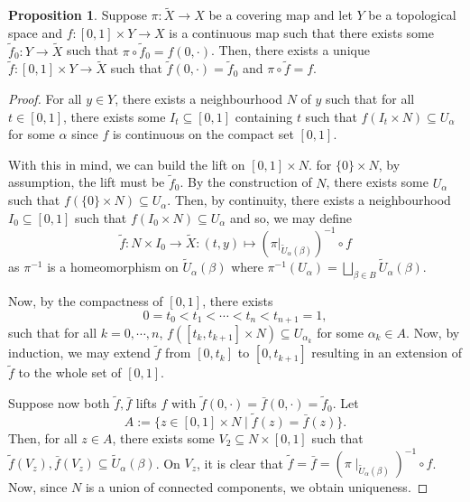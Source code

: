\documentclass[]{article}
\theoremstyle{definition}
\theoremstyle{definition}
\newtheorem{proposition}{Proposition}[section]
\begin{document}
\begin{proposition}
  Suppose \(\pi : \tilde X \to X\) be a covering map and let \(Y\) be a topological space and 
  \(f : [0, 1] \times Y \to X\) is a continuous map such that there exists some 
  \(\tilde f_0 : Y \to \tilde X\) such that \(\pi \circ \tilde f_0 = f(0, \cdot)\).
  Then, there exists a unique \(\tilde f : [0, 1] \times Y \to \tilde X\) such that 
  \(\tilde f(0, \cdot) = \tilde f_0\) and \(\pi \circ \tilde f = f\).
\end{proposition}
\begin{proof}
  For all \(y \in Y\), there exists a neighbourhood \(N\) of \(y\) such that for 
  all \(t \in [0, 1]\), there exists some \(I_t \subseteq [0, 1]\) containing 
  \(t\) such that \(f(I_t \times N) \subseteq U_\alpha\) for some \(\alpha\) since 
  \(f\) is continuous on the compact set \([0, 1]\).
  
  With this in mind, we can build the lift on \([0, 1] \times N\). for \(\{0\} \times N\), 
  by assumption, the lift must be \(\tilde f_0\). By the construction of \(N\), 
  there exists some \(U_\alpha\) such that \(f(\{0\} \times N) \subseteq U_\alpha\).
  Then, by continuity, there exists a neighbourhood \(I_0 \subseteq [0, 1]\) such 
  that \(f(I_0 \times N) \subseteq U_\alpha\) and so, we may define 
  \[\tilde f : N \times I_0 \to \tilde X : (t, y) \mapsto (\pi|_{\tilde U_\alpha(\beta)})^{-1} \circ f\] 
  as \(\pi^{-1}\) is a homeomorphism on \(\tilde U_\alpha(\beta)\) where 
  \(\pi^{-1}(U_\alpha) = \bigsqcup_{\beta \in B} \tilde U_\alpha(\beta).\)

  Now, by the compactness of \([0, 1]\), there exists 
  \[0 = t_0 < t_1 < \cdots < t_n < t_{n + 1} = 1,\]
  such that for all \(k = 0, \cdots, n\), \(f([t_k, t_{k + 1}] \times N) \subseteq U_{\alpha_k}\) 
  for some \(\alpha_k \in A\). Now, by induction, we may extend \(\tilde f\) from 
  \([0, t_k]\) to \([0, t_{k + 1}]\) resulting in an extension of \(\tilde f\) to 
  the whole set of \([0, 1]\). 

  Suppose now both \(\tilde f, \bar f\) lifts \(f\) with 
  \(\tilde f(0, \cdot) = \bar f(0, \cdot) = \tilde f_0\). Let 
  \[A := \{z \in [0, 1] \times N \mid \tilde f(z) = \bar f(z)\}.\]
  Then, for all \(z \in A\), there exists some \(V_2 \subseteq N \times [0, 1]\) 
  such that \(\tilde f(V_z), \bar f(V_z) \subseteq \tilde U_\alpha(\beta)\). 
  On \(V_z\), it is clear that \(\tilde f = \bar f = (\pi\mid_{\tilde U_\alpha(\beta)})^{-1} \circ f\).
  Now, since \(N\) is a union of connected components, we obtain uniqueness.
\end{proof}
\end{document}
